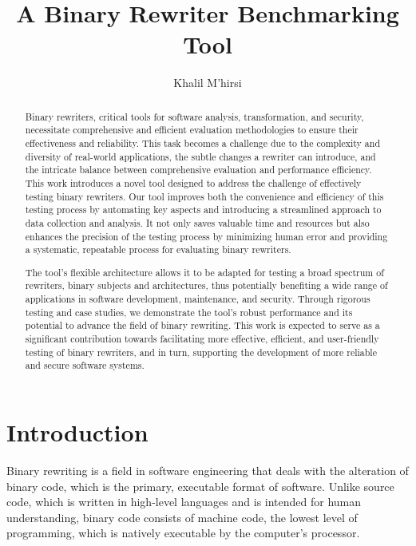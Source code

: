 \documentclass[a4paper,11pt,oneside]{report}
\title{A Binary Rewriter Benchmarking Tool}
\author{Khalil M'hirsi}
\begin{document}
\maketitle

\begin{abstract}
    \setlength{\parindent}{4em}

    \indent{}Binary rewriters, critical tools for software analysis, transformation, and security,
    necessitate comprehensive and efficient evaluation methodologies to ensure their
    effectiveness and reliability. This task becomes a challenge due to the complexity and
    diversity of real-world applications, the subtle changes a rewriter can introduce, and the
    intricate balance between comprehensive evaluation and performance efficiency. This work
    introduces a novel tool designed to address the challenge of effectively testing binary
    rewriters. Our tool improves both the convenience and efficiency of this testing process by
    automating key aspects and introducing a streamlined approach to data collection and
    analysis. It not only saves valuable time and resources but also enhances the precision of the
    testing process by minimizing human error and providing a systematic, repeatable process
    for evaluating binary rewriters.

    The tool's flexible architecture allows it to be adapted for testing a broad spectrum of
    rewriters, binary subjects and architectures, thus potentially benefiting a wide range of
    applications in software development, maintenance, and security. Through rigorous testing
    and case studies, we demonstrate the tool's robust performance and its potential to
    advance the field of binary rewriting. This work is expected to serve as a significant
    contribution towards facilitating more effective, efficient, and user-friendly testing of binary
    rewriters, and in turn, supporting the development of more reliable and secure software
    systems.
\end{abstract}

\maketoc

\chapter{Introduction}

\setlength{\parindent}{4em}

\indent{}Binary rewriting is a field in software engineering that deals with the alteration of
binary code, which is the primary, executable format of software. Unlike source code, which
is written in high-level languages and is intended for human understanding, binary code
consists of machine code, the lowest level of programming, which is natively executable by
the computer's processor.
\end{document}
